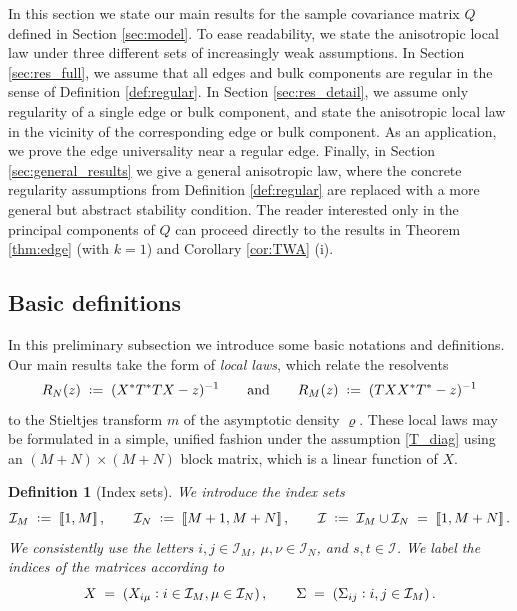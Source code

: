 \documentclass[11pt]{article} %
\numberwithin{equation}{section}
\numberwithin{figure}{section}
\theoremstyle{plain} %
\newtheorem{definition}[theorem]{Definition}
\theoremstyle{definition} %
\renewcommand{\cal}{\mathcal}
\newcommand{\txt}[1]{\text{\rm{#1}}}
\newcommand{\col}{\mathrel{\vcenter{\baselineskip0.75ex \lineskiplimit0pt \hbox{.}\hbox{.}}}}
\newcommand*{\deq}{\mathrel{\vcenter{\baselineskip0.65ex \lineskiplimit0pt \hbox{.}\hbox{.}}}=}
\newcommand{\qq}[1]{[\![{#1}]\!]}
\begin{document}
In this section we state our main results for the sample covariance matrix $Q$ defined in Section \ref{sec:model}. To ease readability, we state the anisotropic local law under three different sets of increasingly weak assumptions. In Section \ref{sec:res_full}, we assume that all edges and bulk components are regular in the sense of Definition \ref{def:regular}. In Section \ref{sec:res_detail}, we assume only regularity of a single edge or bulk component, and state the anisotropic local law in the vicinity of the corresponding edge or bulk component. As an application, we prove the edge universality near a regular edge. Finally, in Section \ref{sec:general_results} we give a general anisotropic law, where the concrete regularity assumptions from Definition \ref{def:regular} are replaced with a more general but abstract stability condition. The reader interested only in the principal components of $Q$ can proceed directly to the results in Theorem \ref{thm:edge} (with $k = 1$) and Corollary \ref{cor:TWA} (i).



\subsection{Basic definitions}
In this preliminary subsection we introduce some basic notations and definitions.
Our main results take the form of \emph{local laws}, which relate the resolvents
\begin{equation} \label{def_RM_RN}
R_N(z) \;\deq\; (X^* T^* T X - z)^{-1} \qquad \txt{and} \qquad R_M(z) \;\deq\; (T X X^* T^* - z)^{-1}
\end{equation}
to the Stieltjes transform $m$ of the asymptotic density $\varrho$. 
These local laws may be formulated in a simple, unified fashion under the assumption \eqref{T_diag} using an $(M + N) \times (M + N)$ block matrix, which is a linear function of $X$.

\begin{definition}[Index sets]
We introduce the index sets
\begin{equation*}
\cal I_M \;\deq\; \qq{1, M}\,, \qquad \cal I_N \;\deq\; \qq{M+1, M+N}\,, \qquad \cal I \;\deq\; \cal I_M \cup \cal I_N \;=\; \qq{1, M+N}\,.
\end{equation*}
We consistently use the letters $i,j \in \cal I_M$, $\mu,\nu \in \cal I_N$, and $s,t \in \cal I$. We label the indices of the matrices according to
\begin{equation*}
X \;=\; (X_{i \mu} \col i \in \cal I_M, \mu \in \cal I_N) \,, \qquad \Sigma \;=\; (\Sigma_{ij} \col i,j \in \cal I_M)\,.
\end{equation*}
\end{definition}
\end{document}
